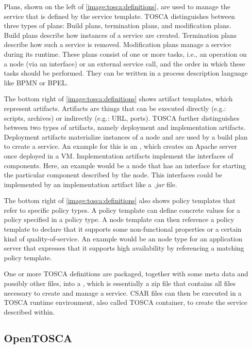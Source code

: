 Plans, shown on the left of \autoref{image:tosca:definitions}, are used to manage the service that is defined by the service template. TOSCA distinguishes between three types of plans: Build plans, termination plans, and modification plans.
Build plans describe how instances of a service are created.
Termination plans describe how such a service is removed.
Modification plans manage a service during its runtime.
These plans consist of one or more tasks, i.e., an operation on a node (via an interface) or an external service call, and the order in which these tasks should be performed.
They can be written in a process description language like BPMN or BPEL.

The bottom right of \autoref{image:tosca:definitions} shows artifact templates, which represent artifacts.
Artifacts are things that can be executed directly (e.g.: scripts, archives) or indirectly (e.g.: URL, ports).
TOSCA further distinguishes between two types of artifacts, namely deployment and implementation artifacts.
Deployment artifacts materialize instances of a node and are used by a build plan to create a service.
An example for this is an , which creates an Apache server once deployed in a VM.
Implementation artifacts implement the interfaces of components.
Here, an example would be a node that has an interface for starting the particular component described by the node.
This interfaces could be implemented by an implementation artifact like a \textit{.jar} file.

The bottom right of \autoref{image:tosca:definitions} also shows policy templates that refer to specific policy types.
A policy template can define concrete values for a policy specified in a policy type.
A node template can then reference a policy template to declare that it supports some non-functional properties or a certain kind of quality-of-service.
An example would be an node type for an application server that expresses that it supports high availability by referencing a matching policy template.

One or more TOSCA definitions are packaged, together with some meta data and possibly other files, into a , which is essentially a zip file that contains all files necessary to create and manage a service.
CSAR files can then be executed in a TOSCA runtime environment, also called TOSCA container, to create the service described within.

\subsection{OpenTOSCA}

